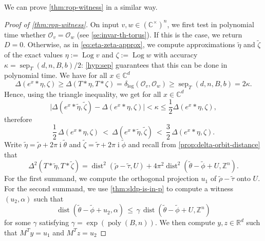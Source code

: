 \documentclass[10pt,a4paper]{article}
\theoremstyle{definition}
\DeclareMathOperator{\poly}{poly}
\DeclareMathOperator{\sep}{sep}
\DeclareMathOperator{\ii}{i}
\DeclareMathOperator{\Log}{Log}
\DeclareMathOperator{\dist}{dist}
\newcommand{\distLD}{\delta_{\log}}
\newcommand{\QQ}{\mathbb{Q}}
\newcommand{\CC}{\mathbb{C}}
\newcommand{\ZZ}{\mathbb{Z}}
\newcommand{\RR}{\mathbb{R}}
\newcommand{\OO}{\ensuremath{\mathcal{O}}}
\numberwithin{equation}{section}
\begin{document}
We can prove \cref{thm:rop-witness} in a similar way.

\begin{proof}[Proof of \cref{thm:rop-witness}]
On input $v,w\in (\CC^\times)^n$,
we first test in polynomial time whether $\OO_v=\OO_w$
(see \cref{se:invar-th-torus}). %
If this is the case, we return $D=0$.
Otherwise, as in \cref{eq:eta-zeta-approx},
we compute approximations
$\tilde{\eta}$ and $\tilde{\zeta}$ of the exact values
$\eta:=\Log v$ and $\zeta:=\Log w$
with accuracy $\kappa=\sep_T(d,n,B,b)/2$:
\cref{hyp:sep}
guarantees that this can be done in
polynomial time.
We have for all $x\in\CC^d$
\[
 \Delta(e^x\ast\eta,\zeta)\geq \Delta(T\ast\eta,T\ast\zeta)=\distLD(\OO_v,\OO_w)\geq\sep_T(d,n,B,b)=2\kappa.
\]
Hence, using the triangle inequality, we get  for all $x\in\CC^d$
\begin{equation*}
  \Big| \Delta(e^x\ast \tilde{\eta}, \tilde{\zeta})  - \Delta(e^x\ast \eta, \zeta) \Big| < \kappa \leq \frac12\Delta(e^x\ast \eta, \zeta) ,
\end{equation*}
therefore
\begin{equation}\label{eq:required-ineqs}
 \frac{1}{2}\, \Delta(e^x\ast \eta, \zeta)  \ <\  \Delta(e^x\ast\tilde{\eta},\tilde{\zeta})\   <\  \frac{3}{2}\, \Delta(e^x\ast \eta, \zeta) .
\end{equation}
Write $\tilde{\eta}=\tilde{\rho}+2\pi\ii\tilde{\theta}$ and $\tilde{\zeta}=\tilde{\tau}+2\pi\ii\tilde{\phi}$ and
recall from \cref{prop:delta-orbit-distance} that
$$
 \Delta^2(T\ast\tilde{\eta},T\ast\tilde{\zeta})
      =\dist^2(\tilde{\rho} -\tilde{\tau}, U)
     + 4\pi^2\dist^2 (\tilde{\theta} -\tilde{\phi} + U,\ZZ^n) .
$$
For the first summand,
we compute the orthogonal projection $u_1$ of $\tilde{\rho} -\tilde{\tau}$ onto $U$.
For the second summand, we use \cref{thm:sldp-is-in-p}
to compute a witness $(u_2,\alpha)$ such that
\begin{equation}\label{eq:dada}
  \dist(\tilde{\theta} -\tilde{\phi} + u_2, \alpha) \,
   \leq \, \gamma\, \dist(\tilde{\theta} -\tilde{\phi}+ U, \ZZ^n)
\end{equation}
for some $\gamma$ satisfying $\gamma=\exp(\poly(B,n))$.
We then compute $y,z\in\RR^d$ such that $M^Ty=u_1$ and $M^Tz=u_2$

\end{proof}
\end{document}
